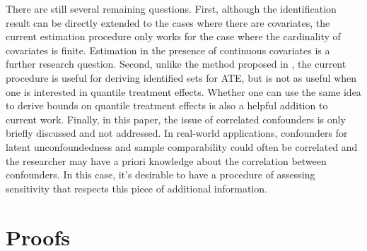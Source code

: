 \documentclass[12pt]{article}
\begin{document}
  There are still several remaining questions. 
  First, although the identification result can be directly extended to the cases where there are covariates, the current estimation procedure only works for the case where the cardinality of covariates is finite. Estimation in the presence of continuous covariates is a further research question. Second, unlike the method proposed in \textcite{masten2018identification}, 
  the current procedure is useful for deriving identified sets for ATE, but is not as useful when one is interested in quantile treatment effects. Whether one can use the same idea to derive bounds on quantile treatment effects is also a helpful addition to current work. Finally, in this paper, the issue of correlated confounders is only briefly discussed and not addressed. In real-world applications, confounders for latent unconfoundedness and sample comparability could often be correlated and the researcher may have a priori knowledge about the correlation between confounders. In this case, it's desirable to have a procedure of assessing sensitivity that respects this piece of additional information. 
    
	\medskip
	
	\pagebreak
	\nocite{*}
	\printbibliography
	
	\pagebreak
	\appendix
	\section{Proofs}

	
	\duality*
	
\end{document}
